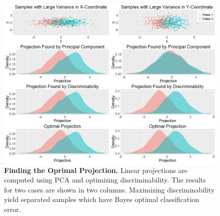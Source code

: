 \documentclass{article}
\begin{document}
\begin{figure}[ht!]
	\includegraphics[width=\linewidth]{../Figs/simu2.png}
	\caption{{\bf Finding the Oprimal Projection.} Linear projections are computed using PCA and optimizing discriminability. The results for two cases are shown in two columns. Maximizing discriminability yield separated samples which have Bayes optimal classification error.}
	\label{fig:simu2}
\end{figure}
\end{document}
